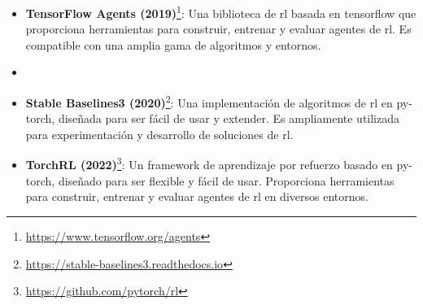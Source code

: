 \begin{itemize}
  \item \textbf{TensorFlow Agents (2019)}\footnote{\url{https://www.tensorflow.org/agents}}: Una biblioteca de \gls{rl} basada en \gls{tensorflow} que proporciona herramientas para construir, entrenar y evaluar agentes de \gls{rl}. Es compatible con una amplia gama de algoritmos y entornos.
  \item   \item \textbf{Stable Baselines3 (2020)}\footnote{\url{https://stable-baselines3.readthedocs.io}}: Una implementación de algoritmos de \gls{rl} en \gls{py-torch}, diseñada para ser fácil de usar y extender. Es ampliamente utilizada para experimentación y desarrollo de soluciones de \gls{rl}.
  \item \textbf{TorchRL (2022)}\footnote{\url{https://github.com/pytorch/rl}}: Un framework de aprendizaje por refuerzo basado en \gls{py-torch}, diseñado para ser flexible y fácil de usar. Proporciona herramientas para construir, entrenar y evaluar agentes de \gls{rl} en diversos entornos.
\end{itemize}

